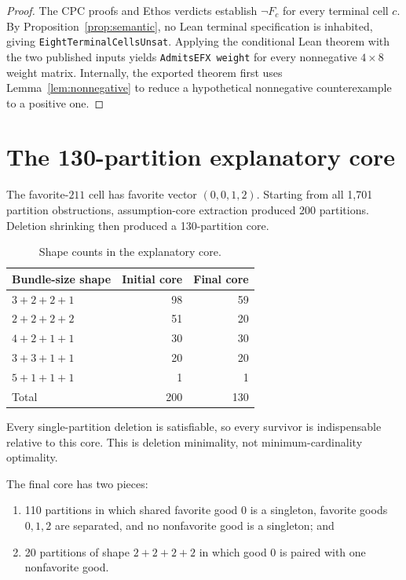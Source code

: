 \documentclass[11pt]{article}
\theoremstyle{definition}
\begin{document}
\begin{proof}
The CPC proofs and Ethos verdicts establish $\neg F_c$ for every terminal
cell $c$. By Proposition~\ref{prop:semantic}, no Lean terminal specification
is inhabited, giving \texttt{EightTerminalCellsUnsat}. Applying the
conditional Lean theorem with the two published inputs yields
\texttt{AdmitsEFX weight} for every
nonnegative $4\times8$ weight matrix. Internally, the exported theorem first
uses Lemma~\ref{lem:nonnegative} to reduce a hypothetical nonnegative
counterexample to a positive one.
\end{proof}

\section{The 130-partition explanatory core}\label{sec:core}

The favorite-$211$ cell has favorite vector $(0,0,1,2)$. Starting from all
1,701 partition obstructions, assumption-core extraction produced 200
partitions. Deletion shrinking then produced a 130-partition core.

\begin{table}[ht]
\centering
\begin{tabular}{@{}lrr@{}}
\toprule
Bundle-size shape & Initial core & Final core\\
\midrule
$3+2+2+1$ & 98 & 59\\
$2+2+2+2$ & 51 & 20\\
$4+2+1+1$ & 30 & 30\\
$3+3+1+1$ & 20 & 20\\
$5+1+1+1$ & 1 & 1\\
\midrule
Total & 200 & 130\\
\bottomrule
\end{tabular}
\caption{Shape counts in the explanatory core.}
\label{tab:core}
\end{table}

Every single-partition deletion is satisfiable, so every survivor is
indispensable relative to this core. This is deletion minimality, not
minimum-cardinality optimality.

The final core has two pieces:
\begin{enumerate}[leftmargin=2.1em]
  \item 110 partitions in which shared favorite good $0$ is a singleton,
  favorite goods $0,1,2$ are separated, and no nonfavorite good is a
  singleton; and
  \item 20 partitions of shape $2+2+2+2$ in which good $0$ is paired with one
  nonfavorite good.
\end{enumerate}
\end{document}
